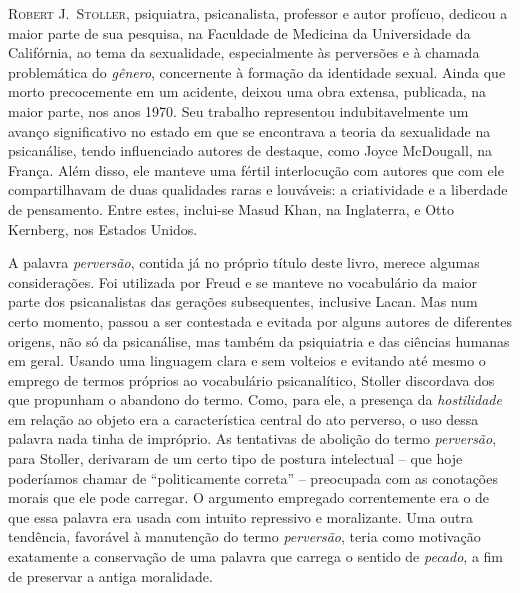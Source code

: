 
\textsc{Robert J.~Stoller,} psiquiatra, psicanalista, professor e autor
profícuo, dedicou a maior parte de sua pesquisa, na Faculdade de
Medicina da Universidade da Califórnia, ao tema da sexualidade,
especialmente às perversões e à chamada problemática do \emph{gênero},
concernente à formação da identidade sexual. Ainda que morto
precocemente em um acidente, deixou uma obra extensa, publicada, na
maior parte, nos anos 1970. Seu trabalho representou indubitavelmente um
avanço significativo no estado em que se encontrava a teoria da
sexualidade na psicanálise, tendo influenciado autores de destaque, como
Joyce McDougall, na França. Além disso, ele manteve uma fértil
interlocução com autores que com ele compartilhavam de duas qualidades
raras e louváveis: a criatividade e a liberdade de pensamento. Entre
estes, inclui-se Masud Khan, na Inglaterra, e Otto Kernberg, nos Estados
Unidos.

A palavra \emph{perversão}, contida já no próprio título deste livro,
merece algumas considerações. Foi utilizada por Freud e se manteve no
vocabulário da maior parte dos psicanalistas das gerações subsequentes,
inclusive Lacan. Mas num certo momento, passou a ser contestada e
evitada por alguns autores de diferentes origens, não só da psicanálise,
mas também da psiquiatria e das ciências humanas em geral. Usando uma
linguagem clara e sem volteios e evitando até mesmo o emprego de termos
próprios ao vocabulário psicanalítico, Stoller discordava dos que
propunham o abandono do termo. Como, para ele, a presença da
\emph{hostilidade} em relação ao objeto era a característica central do
ato perverso, o uso dessa palavra nada tinha de impróprio. As tentativas
de abolição do termo \emph{perversão}, para Stoller, derivaram de um
certo tipo de postura intelectual -- que hoje poderíamos chamar de
``politicamente correta'' -- preocupada com as conotações morais que ele
pode carregar. O argumento empregado correntemente era o de que essa
palavra era usada com intuito repressivo e moralizante. Uma outra
tendência, favorável à manutenção do termo \emph{perversão}, teria como
motivação exatamente a conservação de uma palavra que carrega o sentido
de \emph{pecado}, a fim de preservar a antiga moralidade.

